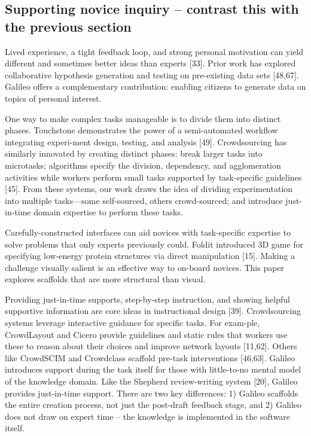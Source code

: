\subsection{Supporting novice inquiry -- contrast this with the previous section}
Lived experience, a tight feedback loop, and strong personal motivation can yield different and sometimes better ideas than experts [33]. Prior work has explored collaborative hypothesis generation and testing on pre-existing data sets [48,67]. Galileo offers a complementary contribution: enabling citizens to generate data on topics of personal interest.

One way to make complex tasks manageable is to divide them into distinct phases. Touchstone demonstrates the power of a semi-automated workflow integrating experi-ment design, testing, and analysis [49]. Crowdsourcing has similarly innovated by creating distinct phases: break larger tasks into microtasks; algorithms specify the division, dependency, and agglomeration activities while workers perform small tasks supported by task-specific guidelines [45]. From these systems, our work draws the idea of dividing experimentation into multiple tasks—some self-sourced, others crowd-sourced; and introduce just-in-time domain expertise to perform these tasks. 

Carefully-constructed interfaces can aid novices with task-specific expertise to solve problems that only experts previously could. Foldit introduced 3D game for specifying low-energy protein structures via direct manipulation [15]. Making a challenge visually salient is an effective way to on-board novices. This paper explores scaffolds that are more structural than visual.

Providing just-in-time supports, step-by-step instruction, and showing helpful supportive information are core ideas in instructional design [39]. Crowdsourcing systems leverage interactive guidance for specific tasks. For exam-ple, CrowdLayout and Cicero provide guidelines and static rules that workers use these to reason about their choices and improve network layouts [11,62]. Others like CrowdSCIM and Crowdclass scaffold pre-task interventions [46,63]. Galileo introduces support during the task itself for those with little-to-no mental model of the knowledge domain. Like the Shepherd review-writing system [20], Galileo provides just-in-time support. There are two key differences: 1) Galileo scaffolds the entire creation process, not just the post-draft feedback stage, and 2) Galileo does not draw on expert time – the knowledge is implemented in the software itself. 

